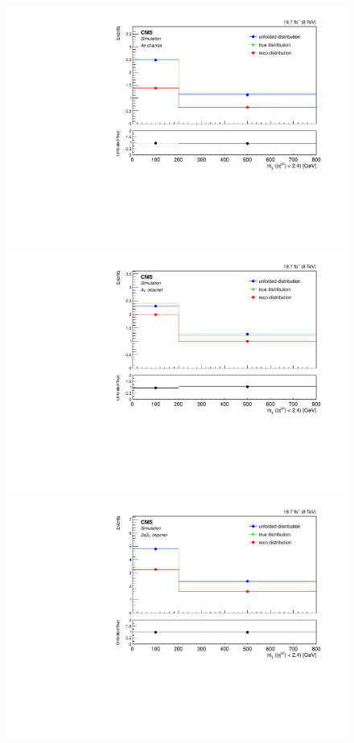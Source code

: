 \begin{figure}[hbtp]
\begin{center}
    \includegraphics[width=0.8\cmsFigWidth]{Figures/Unfolding/MCTests/CentralMjj_ZZTo4e_MadMatrix_MadDistr_HalfSample_fr}     
    \includegraphics[width=0.8\cmsFigWidth]{Figures/Unfolding/MCTests/CentralMjj_ZZTo4m_MadMatrix_MadDistr_HalfSample_fr}     
    \includegraphics[width=0.8\cmsFigWidth]{Figures/Unfolding/MCTests/CentralMjj_ZZTo2e2m_MadMatrix_MadDistr_HalfSample_fr}     

\end{center}
\end{figure}
